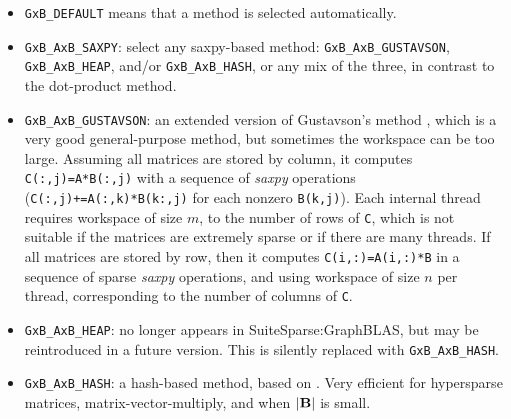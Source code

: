 \documentclass[12pt]{article}
\begin{document}
\begin{itemize}
\begin{itemize}
    \item \verb'GxB_DEFAULT' means that a method is selected automatically.

    \item \verb'GxB_AxB_SAXPY': select any saxpy-based method:
        \verb'GxB_AxB_GUSTAVSON', \verb'GxB_AxB_HEAP', and/or
        \verb'GxB_AxB_HASH', or any mix of the three,
        in contrast to the dot-product method.

    \item \verb'GxB_AxB_GUSTAVSON':  an extended version of Gustavson's method
    \cite{Gustavson78}, which is a very good general-purpose method, but
    sometimes the workspace can be too large.  Assuming all matrices are stored
    by column, it computes \verb'C(:,j)=A*B(:,j)' with a sequence of {\em
    saxpy} operations (\verb'C(:,j)+=A(:,k)*B(k:,j)' for each nonzero
    \verb'B(k,j)').  Each internal thread requires workspace of size $m$, to
    the number of rows of \verb'C', which is not suitable if the matrices are
    extremely sparse or if there are many threads.  If all matrices are stored
    by row, then it computes \verb'C(i,:)=A(i,:)*B' in a sequence of sparse
    {\em saxpy} operations, and using workspace of size $n$ per thread,
    corresponding to the number of columns of \verb'C'.

    \item \verb'GxB_AxB_HEAP': no longer appears in SuiteSparse:GraphBLAS, but
    may be reintroduced in a future version.  This is silently replaced with
    \verb'GxB_AxB_HASH'.

    \item \verb'GxB_AxB_HASH':  a hash-based method, based on
        \cite{10.1145/3229710.3229720}.  Very efficient for hypersparse
        matrices, matrix-vector-multiply, and when $|{\bf B}|$ is small.



\end{itemize}
\end{itemize}
\end{document}
